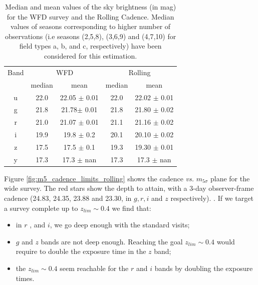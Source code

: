 \documentclass[\docopts]{\docclass}
\begin{document}
\begin{table}[t]
\begin{center}
\caption{Median and mean values of the sky brightness (in mag)  for the WFD survey and the Rolling
  Cadence. Median values of seasons corresponding to
  higher number of observations (i.e seasons (2,5,8), (3,6,9) and
  (4,7,10) for field types a, b, and c, respectively) have been
  considered for this estimation. }
\label{tab:rolling_sky}
\begin{tabular}{c|c|c|c|c}
\hline
\hline
   Band  & \multicolumn{2}{|c}{WFD}  &      \multicolumn{2}{|c}{Rolling} \\
            &     median & mean & median & mean \\
\hline
     u   &  22.0  & 22.05 $\pm$ 0.01  & 22.0  & 22.02 $\pm$ 0.01 \\
     g   &  21.8  & 21.78$\pm$ 0.01  & 21.8  & 21.80 $\pm$ 0.02  \\
     r   &   21.0  & 21.07 $\pm$ 0.01   & 21.1  & 21.16 $\pm$ 0.02  \\
     i   &   19.9  & 19.8 $\pm$ 0.2   & 20.1  & 20.10 $\pm$ 0.02 \\
     z  &   17.5  & 17.5 $\pm$ 0.1  & 19.3  & 19.30 $\pm$ 0.01 \\
    y  &    17.3  & 17.3 $\pm$ nan & 17.3   & 17.3 $\pm$ nan \\
\hline
\end{tabular}
\end{center}
\end{table}
Figure \ref{fig:m5_cadence_limits_rolling} shows the cadence {\em
  vs.}  $m_{5\sigma}$ plane for the wide survey.  The red stars
show the depth to attain, with a 3-day observer-frame cadence
(24.83, 24.35, 23.88 and 23.30, in $g, r, i$ and $z$ respectively). .  If we target a survey complete up to $z_{lim} \sim 0.4$
we find that:
\begin{itemize}
  \item in $r$ , and $ i$, we go deep enough with the standard visits;
  \item $g$ and $z$ bands are not deep enough. Reaching the goal
    $z_{lim} \sim 0.4$ would require to double the exposure time in
    the $z$ band;
  \item the $z_{lim} \sim 0.4$ seem reachable for the $r$ and $i$
    bands by doubling the exposure times.
\end{itemize}
\end{document}
